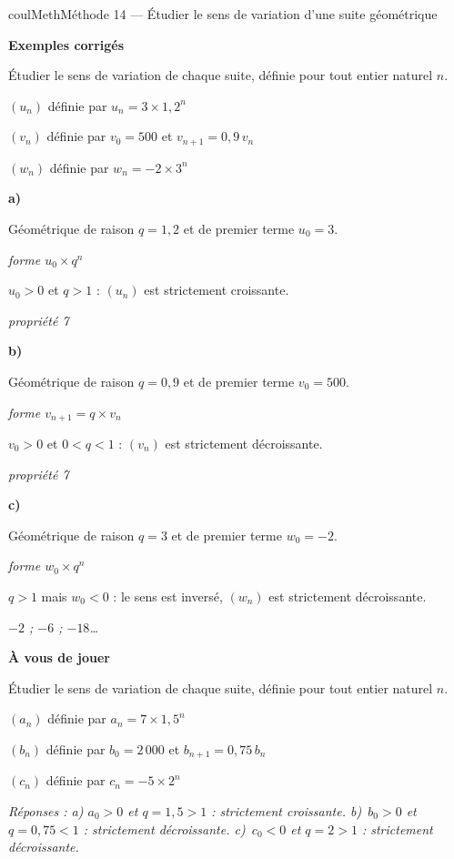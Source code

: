 \documentclass[11pt,a4paper]{article}
\makeatletter
\newcounter{lycee@signet}
\newcommand{\signet}[3][]{\stepcounter{lycee@signet}%
  \edef\lycee@dest{\if\relax\detokenize{#1}\relax
    signet.\arabic{lycee@signet}\else#1\fi}%
  \hypertarget{\lycee@dest}{}\bookmark[level=#2,dest=\lycee@dest]{#3}}
\newcommand{\res}[1]{#1}
\newcounter{methode}
\newenvironment{methodebox}[1][Méthode]{\stepcounter{methode}%
  \begin{boitecours}[phantom={\signet[methode-\arabic{methode}]{2}{#1}}]{coulMeth}{#1}}%
  {\end{boitecours}}
\newcommand{\etape}[1]{\par\smallskip\textbf{\color{coulMeth}#1}\par\nobreak\smallskip}
\newcommand{\reponse}[1]{\par\smallskip
  {\footnotesize\itshape\color{black!55}Réponses : #1}}
\newcommand{\explique}[2]{\par\smallskip\noindent
  \begin{minipage}[t]{0.57\linewidth}\raggedright #1\end{minipage}\hfill
  \begin{minipage}[t]{0.40\linewidth}\raggedright\leavevmode
    {\small\itshape\color{black!60}#2}\end{minipage}\par}
\newcommand{\cas}[1]{\par\smallskip\noindent\textbf{\color{coulExo}#1}\vadjust{\nobreak}}
\newenvironment{correction}{\par}{\par}
\newcommand{\etapeexemples}{\etape{Exemples corrigés}}
\makeatother
\begin{document}
\begin{methodebox}[Méthode 14 --- Étudier le sens de variation d'une suite géométrique]
\etapeexemples
Étudier le sens de variation de chaque suite, définie pour tout entier naturel $n$.
\begin{questions}[label=\alph*)]
  \item $(u_{n})$ définie par $u_{n}=3\times 1{,}2^{n}$
  \item $(v_{n})$ définie par $v_{0}=500$ et $v_{n+1}=0{,}9\,v_{n}$
  \item $(w_{n})$ définie par $w_{n}=-2\times 3^{n}$
\end{questions}
\begin{correction}
\cas{a)}
\explique{Géométrique de raison $q=1{,}2$ et de premier terme $u_{0}=3$.}{forme
$u_{0}\times q^{n}$}
\explique{$u_{0}>0$ et $q>1$ : $(u_{n})$ est \res{strictement croissante}.}{propriété 7}
\cas{b)}
\explique{Géométrique de raison $q=0{,}9$ et de premier terme $v_{0}=500$.}{forme
$v_{n+1}=q\times v_{n}$}
\explique{$v_{0}>0$ et $0<q<1$ : $(v_{n})$ est \res{strictement décroissante}.}{propriété 7}
\cas{c)}
\explique{Géométrique de raison $q=3$ et de premier terme $w_{0}=-2$.}{forme
$w_{0}\times q^{n}$}
\explique{$q>1$ mais $w_{0}<0$ : le sens est inversé, $(w_{n})$ est \res{strictement
décroissante}.}{$-2$ ; $-6$ ; $-18$\dots}
\end{correction}

\etape{À vous de jouer}
Étudier le sens de variation de chaque suite, définie pour tout entier naturel $n$.
\begin{questions}[label=\alph*)]
  \item $(a_{n})$ définie par $a_{n}=7\times 1{,}5^{n}$
  \item $(b_{n})$ définie par $b_{0}=2\,000$ et $b_{n+1}=0{,}75\,b_{n}$
  \item $(c_{n})$ définie par $c_{n}=-5\times 2^{n}$
\end{questions}
\reponse{a) $a_{0}>0$ et $q=1{,}5>1$ : strictement croissante.\; b)~$b_{0}>0$ et
$q=0{,}75<1$ : strictement décroissante.\; c)~$c_{0}<0$ et $q=2>1$ : strictement
décroissante.}
\end{methodebox}
\end{document}
